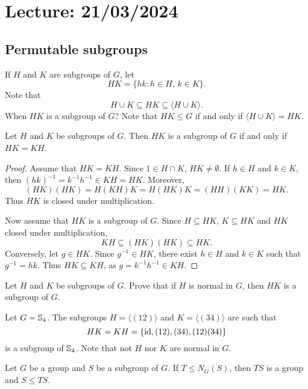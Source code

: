 \section{Lecture: 21/03/2024}

\subsection{Permutable subgroups}

If $H$ and $K$ are subgroups of $G$, let 
\[
        HK=\{hk:h\in H,\,k\in K\}.
\]
Note that 
\[
H\cup K\subseteq HK\subseteq\langle H\cup K\rangle.
\]
When $HK$ is a subgroup of $G$? 
Note that $HK\leq G$ if and only if $\langle H\cup K\rangle=HK$.

\begin{proposition}
        Let $H$ and $K$ be subgroups of $G$. Then $HK$ is a subgroup of
        $G$ if and only if $HK=KH$.
\end{proposition}

\begin{proof}
    Assume that $HK=KH$. Since $1\in H\cap K$, $HK\ne\emptyset$. 
    If $h\in H$ and $k\in K$, then $(hk)^{-1}=k^{-1}h^{-1}\in KH=HK$. Moreover, 
    \[
    (HK)(HK)=H(KH)K=H(HK)K=(HH)(KK)=HK.
    \]
    Thus $HK$ is closed under multiplication. 

    Now assume that $HK$ is a subgroup of $G$. Since $H\subseteq HK$,
    $K\subseteq HK$ and $HK$ closed under multiplication,
        \[
        KH\subseteq (HK)(HK)\subseteq HK.
        \]
        Conversely, let $g\in HK$.
        Since $g^{-1}\in HK$, there exist $h\in H$ and $k\in K$ such that
        $g^{-1}=hk$.
        Thus $HK\subseteq KH$, as 
        $g=k^{-1}h^{-1}\in KH$.
\end{proof}

\begin{exercise}
\label{xca:HK_normal}
Let $H$ and $K$ be subgroups of $G$. Prove that 
if $H$ is normal in $G$, then $HK$ is a subgroup of $G$.
\end{exercise}

\begin{example}
Let $G=\mathbb{S}_4$. The subgroups $H=\langle (12)\rangle$ and $K=\langle (34)\rangle$ are such that 
\[
HK=KH=\{
\operatorname{id},(12),(34),(12)(34)\}
\]
is a subgroup of 
$\mathbb{S}_4$. Note that not $H$ nor $K$
are normal in $G$.
\end{example}

\begin{exercise}
Let $G$ be a group and $S$ be a subgroup of $G$. 
If $T\leq N_G(S)$, then $TS$ is a group and $S\leq TS$.
\end{exercise}

